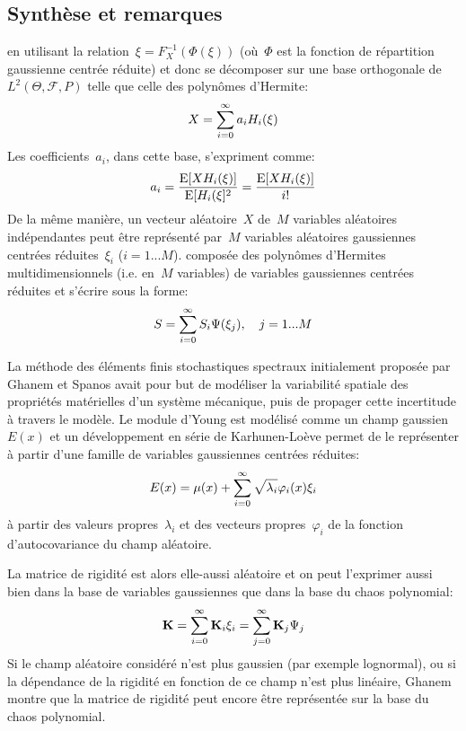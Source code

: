 \medskip
\subsection{Synthèse et remarques}

 en utilisant la relation~$\xi=F_X^{-1}(\Phi(\xi))$ (où~$\Phi$ est la fonction de répartition gaussienne centrée réduite) et donc se décomposer sur une base orthogonale de~$L^2(\Theta,\mathcal{F},P)$ telle que celle des polynômes d'Hermite: 
$$X=\displaystyle\sum_{i=0}^\infty a_i H_i(\xi)$$
Les coefficients~$a_i$, dans cette base, s'expriment comme: 
$$a_i=\dfrac{\operatorname{E}[XH_i(\xi)]}{\operatorname{E}[H_i(\xi]^2}=\dfrac{\operatorname{E}[XH_i(\xi)]}{i!}$$
De la même manière, un vecteur aléatoire~$X$ de~$M$ variables aléatoires indépendantes peut être représenté par~$M$ variables aléatoires gaussiennes centrées réduites~$\xi_i$ ($i=1...M$).  composée des polynômes d'Hermites multidimensionnels (i.e. en~$M$ variables) de variables gaussiennes centrées réduites et s'écrire sous la forme: 
$$S=\displaystyle\sum_{i=0}^\infty S_i\Psi(\xi_j), \quad j=1...M$$

\medskip
La méthode des éléments finis stochastiques spectraux initialement proposée par Ghanem et Spanos avait pour but de modéliser la variabilité spatiale des propriétés matérielles d'un système mécanique, puis de propager cette incertitude à travers le modèle. Le module d'Young est modélisé comme un champ gaussien~$E(x)$ et un développement en série de Karhunen-Loève permet de le représenter à partir d'une famille de variables gaussiennes centrées réduites:
$$ E(x) = \mu(x) + \displaystyle\sum_{i=0}^\infty \sqrt{\lambda_i}\varphi_i(x)\xi_i $$
à partir des valeurs propres~$\lambda_i$ et des vecteurs propres~$\varphi_i$ de la fonction d'autocovariance du champ aléatoire. 

La matrice de rigidité est alors elle-aussi aléatoire et on peut l'exprimer aussi bien dans la base de variables gaussiennes que dans la base du chaos polynomial:
$$ \MM{K}=\dsum_{i=0}^\infty \MM{K}_i\xi_i = \dsum_{j=0}^\infty \MM{K}_j\Psi_j $$
Si le champ aléatoire considéré n'est plus gaussien (par exemple lognormal), ou si la dépendance de la rigidité en fonction de ce champ n'est plus linéaire, Ghanem montre que la matrice de rigidité peut encore être représentée sur la base du chaos polynomial. 

